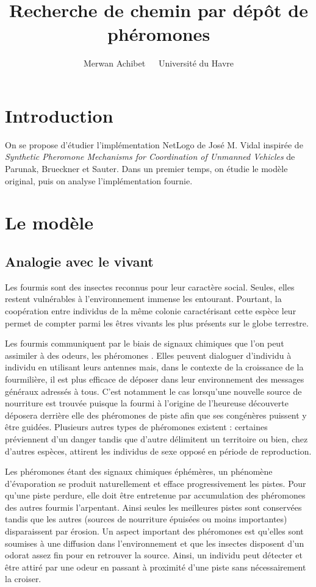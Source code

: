 \documentclass[12pt]{article}
\title{Recherche de chemin par dépôt de phéromones}
\author{Merwan Achibet $\;$ \textendash $\;$ Université du Havre}
\date{}
\begin{document}
\maketitle

\section*{Introduction}

On se propose d'étudier l'implémentation NetLogo de José M. Vidal
inspirée de \textit{Synthetic Pheromone Mechanisms for Coordination of
  Unmanned Vehicles} de Parunak, Brueckner et Sauter. Dans un premier
temps, on étudie le modèle original, puis on analyse l'implémentation
fournie.

\section{Le modèle}

\subsection{Analogie avec le vivant}

Les fourmis sont des insectes reconnus pour leur caractère
social. Seules, elles restent vulnérables à l'environnement immense
les entourant. Pourtant, la coopération entre individus de la même
colonie caractérisant cette espèce leur permet de compter parmi les
êtres vivants les plus présents sur le globe terrestre.

Les fourmis communiquent par le biais de signaux chimiques que l'on
peut assimiler à des odeurs, les phéromones \cite{insectes}. Elles
peuvent dialoguer d'individu à individu en utilisant leurs antennes
mais, dans le contexte de la croissance de la fourmilière, il est plus
efficace de déposer dans leur environnement des messages généraux
adressés à tous. C'est notamment le cas lorsqu'une nouvelle source de
nourriture est trouvée puisque la fourmi à l'origine de l'heureuse
découverte déposera derrière elle des phéromones de piste afin que ses
congénères puissent y être guidées. Plusieurs autres types de
phéromones existent : certaines préviennent d'un danger tandis que
d'autre délimitent un territoire ou bien, chez d'autres espèces,
attirent les individus de sexe opposé en période de reproduction.

Les phéromones étant des signaux chimiques éphémères, un phénomène
d'évaporation se produit naturellement et efface progressivement les
pistes.  Pour qu'une piste perdure, elle doit être entretenue par
accumulation des phéromones des autres fourmis l'arpentant. Ainsi
seules les meilleures pistes sont conservées tandis que les autres
(sources de nourriture épuisées ou moins importantes) disparaissent
par érosion.  Un aspect important des phéromones est qu'elles sont
soumises à une diffusion dans l'environnement et que les insectes
disposent d'un odorat assez fin pour en retrouver la source. Ainsi, un
individu peut détecter et être attiré par une odeur en passant à
proximité d'une piste sans nécessairement la croiser.
\end{document}

